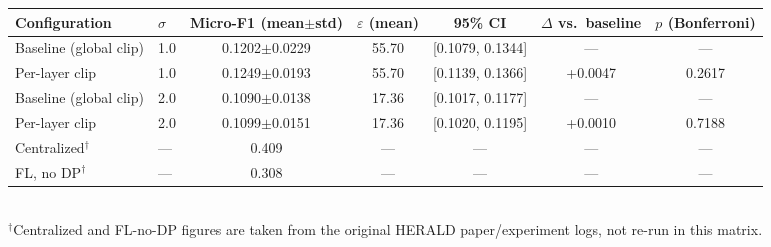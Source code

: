 \begin{tabular}{llccccc}
\toprule
Configuration & $\sigma$ & Micro-F1 (mean$\pm$std) & $\varepsilon$ (mean) & 95\% CI & $\Delta$ vs.\ baseline & $p$ (Bonferroni) \\
\midrule
Baseline (global clip) & 1.0 & 0.1202$\pm$0.0229 & 55.70 & [0.1079, 0.1344] & — & — \\
Per-layer clip & 1.0 & 0.1249$\pm$0.0193 & 55.70 & [0.1139, 0.1366] & +0.0047 & 0.2617 \\
\midrule
Baseline (global clip) & 2.0 & 0.1090$\pm$0.0138 & 17.36 & [0.1017, 0.1177] & — & — \\
Per-layer clip & 2.0 & 0.1099$\pm$0.0151 & 17.36 & [0.1020, 0.1195] & +0.0010 & 0.7188 \\
\midrule
Centralized$^\dagger$ & — & 0.409 & — & — & — & — \\
FL, no DP$^\dagger$ & — & 0.308 & — & — & — & — \\
\bottomrule
\end{tabular}
\\[2pt]
{\footnotesize $^\dagger$Centralized and FL-no-DP figures are taken from the original HERALD paper/experiment logs, not re-run in this matrix.}
